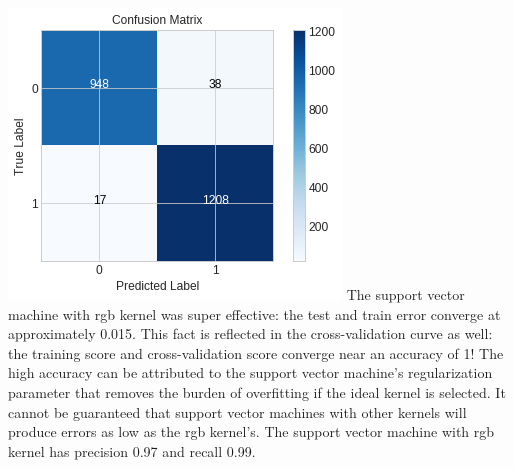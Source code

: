 \documentclass[11pt, a4paper]{article} %
\begin{document}
\quad\quad\quad\quad
\includegraphics[scale=0.55]{SVM_Confusion_Matrix_2.png}
\newline\newline
The support vector machine with rgb kernel was super effective: the test and train error converge at approximately 0.015. This fact is reflected in the cross-validation curve as well: the training score and cross-validation score converge near an accuracy of 1! The high accuracy can be attributed to the support vector machine's regularization parameter that removes the burden of overfitting if the ideal kernel is selected. It cannot be guaranteed that support vector machines with other kernels will produce errors as low as the rgb kernel's. The support vector machine with rgb kernel has precision 0.97 and recall 0.99.
\end{document}
